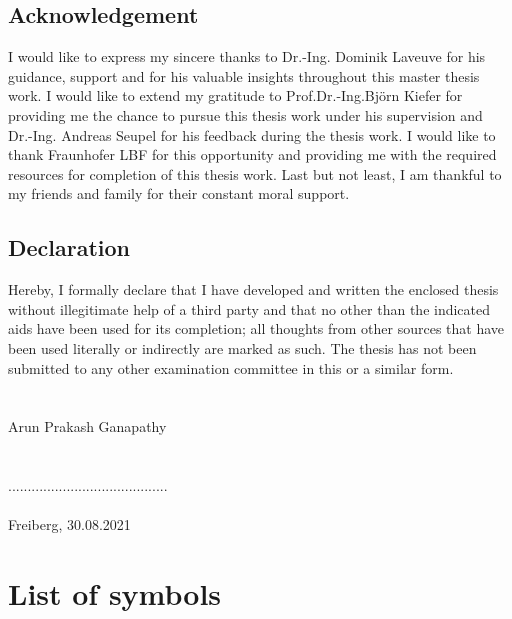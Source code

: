 \documentclass[12pt,a4paper,twoside,openright]{report}
\begin{document}
\section*{\LARGE{Acknowledgement} }
\vspace*{1cm}
\indent\indent\indent   I would like to express my sincere thanks to Dr.-Ing. Dominik Laveuve for his guidance, support and for his valuable insights throughout this master thesis work.  I would like to extend my gratitude to Prof.Dr.-Ing.Björn Kiefer for providing me the chance to pursue this thesis work under his supervision and Dr.-Ing. Andreas Seupel for his feedback during the thesis work.  I would like to thank Fraunhofer LBF for this opportunity and providing me with the required resources for completion of this thesis work. Last but not least, I am thankful to my friends and family for their constant moral support.



\clearpage
\thispagestyle{empty}
\hfill
\clearpage
\vspace*{2cm}
\section*{\LARGE{Declaration} }
\vspace*{1cm}
\indent\indent\indent Hereby, I  formally declare that I  have developed and written the enclosed thesis 
without illegitimate help of a third party and that no other than the indicated aids have been used for its completion; all thoughts from other sources that have been used literally or indirectly are marked as such. The thesis has not been submitted to any other examination committee in this or a similar form.\\\\\\ Arun Prakash Ganapathy  \\\\\\ .........................................  \\\\ Freiberg, 30.08.2021





\tableofcontents
\listoffigures
\listoftables


\chapter*{List of symbols}
\end{document}
